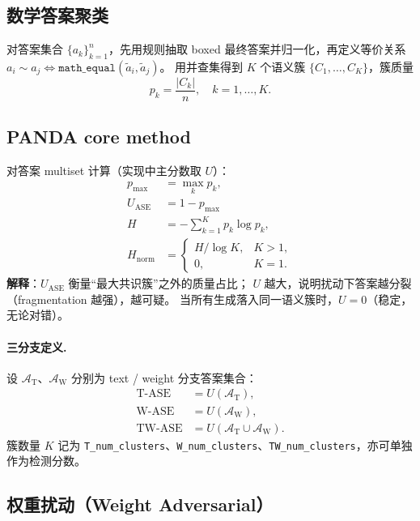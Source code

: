 \documentclass[11pt,a4paper]{article}
\begin{document}
\subsection{数学答案聚类}

对答案集合 $\{a_k\}_{k=1}^{n}$，先用规则抽取 boxed 最终答案并归一化，再定义等价关系
$a_i \sim a_j \Leftrightarrow \texttt{math\_equal}(\tilde a_i, \tilde a_j)$。
用并查集得到 $K$ 个语义簇 $\{C_1,\ldots,C_K\}$，簇质量
\begin{equation}
  p_k = \frac{|C_k|}{n}, \quad k=1,\ldots,K.
\end{equation}

\subsection{PANDA core method}

对答案 multiset 计算（实现中主分数取 $U$）：
\begin{align}
  p_{\max} &= \max_k p_k, \\
  U_{\mathrm{ASE}} &= 1 - p_{\max} \label{eq:U} \\
  H &= -\sum_{k=1}^{K} p_k \log p_k, \\
  H_{\mathrm{norm}} &= \begin{cases}
    H / \log K, & K > 1, \\
    0, & K = 1.
  \end{cases}
\end{align}
\textbf{解释}：$U_{\mathrm{ASE}}$ 衡量``最大共识簇''之外的质量占比；
$U$ 越大，说明扰动下答案越分裂（fragmentation 越强），越可疑。
当所有生成落入同一语义簇时，$U{=}0$（稳定，无论对错）。

\paragraph{三分支定义.}
设 $\mathcal{A}_{\mathrm{T}}$、$\mathcal{A}_{\mathrm{W}}$ 分别为 text / weight 分支答案集合：
\begin{align}
  \mathrm{T\text{-}ASE} &= U(\mathcal{A}_{\mathrm{T}}), \\
  \mathrm{W\text{-}ASE} &= U(\mathcal{A}_{\mathrm{W}}), \\
  \mathrm{TW\text{-}ASE} &= U(\mathcal{A}_{\mathrm{T}} \cup \mathcal{A}_{\mathrm{W}}).
\end{align}
簇数量 $K$ 记为 \texttt{T\_num\_clusters}、\texttt{W\_num\_clusters}、\texttt{TW\_num\_clusters}，亦可单独作为检测分数。

\subsection{权重扰动（Weight Adversarial）}
\end{document}
